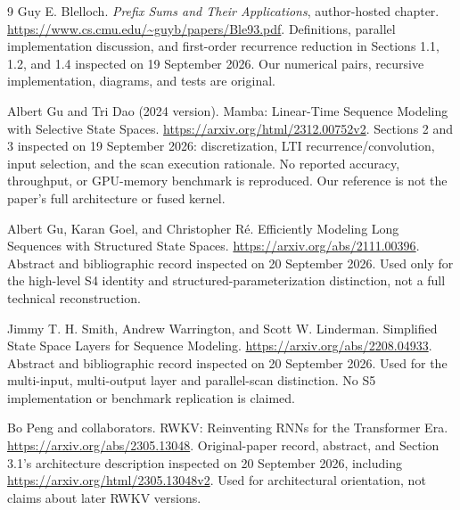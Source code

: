 \renewcommand{\bibname}{Sources and reading notes}
\begin{thebibliography}{9}
 Guy E. Blelloch.
\emph{Prefix Sums and Their Applications}, author-hosted chapter.
\url{https://www.cs.cmu.edu/~guyb/papers/Ble93.pdf}.
Definitions, parallel implementation discussion, and first-order recurrence
reduction in Sections 1.1, 1.2, and 1.4 inspected on 19 September 2026.
Our numerical pairs, recursive implementation, diagrams, and tests are original.

 Albert Gu and Tri Dao (2024 version).
Mamba: Linear-Time Sequence Modeling with Selective State Spaces.
\url{https://arxiv.org/html/2312.00752v2}.
Sections 2 and 3 inspected on 19 September 2026: discretization, LTI
recurrence/convolution, input selection, and the scan execution rationale.
No reported accuracy, throughput, or GPU-memory benchmark is reproduced.
Our reference is not the paper's full architecture or fused kernel.

 Albert Gu, Karan Goel, and Christopher R\'e.
Efficiently Modeling Long Sequences with Structured State Spaces.
\url{https://arxiv.org/abs/2111.00396}.
Abstract and bibliographic record inspected on 20 September 2026.
Used only for the high-level S4 identity and structured-parameterization
distinction, not a full technical reconstruction.

 Jimmy T. H. Smith, Andrew Warrington, and Scott W. Linderman.
Simplified State Space Layers for Sequence Modeling.
\url{https://arxiv.org/abs/2208.04933}.
Abstract and bibliographic record inspected on 20 September 2026.
Used for the multi-input, multi-output layer and parallel-scan distinction.
No S5 implementation or benchmark replication is claimed.

 Bo Peng and collaborators.
RWKV: Reinventing RNNs for the Transformer Era.
\url{https://arxiv.org/abs/2305.13048}.
Original-paper record, abstract, and Section 3.1's architecture description
inspected on 20 September 2026, including
\url{https://arxiv.org/html/2305.13048v2}.
Used for architectural orientation, not claims about later RWKV versions.
\end{thebibliography}
